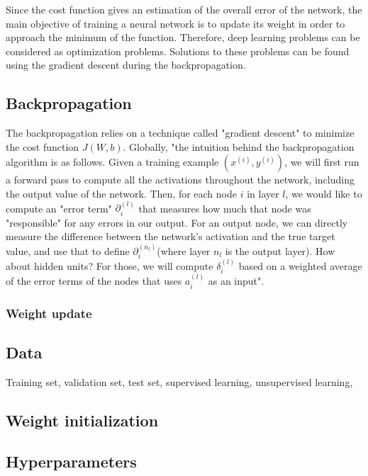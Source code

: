 Since the cost function gives an estimation of the overall error of the network, the main objective of training a neural network is to update its weight in order to approach the minimum of the function. Therefore, deep learning problems can be considered as optimization problems. Solutions to these problems can be found using the gradient descent during the backpropagation.
\subsection{Backpropagation}
The backpropagation relies on a technique called "gradient descent" to minimize the cost function $J(W, b)$. Globally, "the intuition behind the backpropagation algorithm is as follows. Given a training example $(x^{(i)}, y^{(i)})$, we will first run a forward pass to compute all the activations throughout the network, including the output value of the network. Then, for each node $i$ in layer $l$, we would like to compute an "error term" $\partial^{(l)}_{i}$ that measures how much that node was "responsible" for any errors in our output. For an output node, we can directly measure the difference between the network’s activation and the true target value, and use that to define $\partial^{(n_{l})}_{i}$(where layer $n_{l}$ is the output layer). How about hidden units? For those, we will compute $\delta^{(l)}_{i}$ based on a weighted average of the error terms of the nodes that uses $a^{(l)}_{i}$ as an input"\cite{24}.


\subsubsection{Weight update}






\subsection{Data}
Training set, validation set, test set, supervised learning, unsupervised learning,

\subsection{Weight initialization}
\label{weight_optimization}

\subsection{Hyperparameters}


